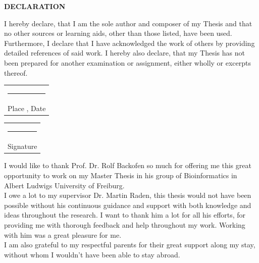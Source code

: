 \documentclass[twoside,a4paper]{report}
\numberwithin{equation}{section}
\begin{document}


\newpage
\begin{center}

\textbf{ \Large DECLARATION}\\
	
\end{center}
 	\vspace{0.9cm}
I hereby declare, that I am the sole author and composer of my Thesis and that no
other sources or learning aids, other than those listed, have been used. Furthermore, I declare that I have acknowledged the work of others by providing detailed references of said work. I hereby also declare, that my Thesis has not been prepared for another examination or assignment, either wholly or excerpts thereof.
\\

\hfill%
\vspace{0.9cm}

\begin{tabular}[t]{c}
	
	\rule{10em}{0.4pt}\\ Place , Date
\end{tabular}%
\hfill%
\begin{tabular}[t]{c}
	\rule{10em}{0.4pt}\\ Signature
\end{tabular}%


\newpage

I would like to thank Prof. Dr. Rolf Backofen so much for offering me this great opportunity to work on my Master Thesis in his group of Bioinformatics in Albert Ludwigs University of Freiburg.\\

I owe a lot to my supervisor Dr. Martin Raden, this thesis would not have been possible without his continuous guidance and support with both knowledge and ideas throughout the research. I want to thank him a lot for all his efforts, for providing me with thorough feedback and help throughout my work. Working with him was a great pleasure for me.\\

I am also grateful to my respectful parents for their great support along my stay,
without whom I wouldn’t have been able to stay abroad.\\
\end{document}
